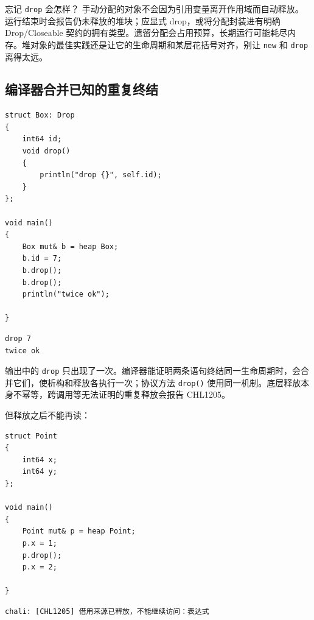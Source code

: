 忘记 \texttt{drop} 会怎样？ 手动分配的对象不会因为引用变量离开作用域而自动释放。运行结束时会报告仍未释放的堆块；应显式 drop，或将分配封装进有明确 Drop/Closeable 契约的拥有类型。遗留分配会占用预算，长期运行可能耗尽内存。堆对象的最佳实践还是让它的生命周期和某层花括号对齐，别让 \texttt{new} 和 \texttt{drop} 离得太远。

\subsection*{编译器合并已知的重复终结}

\par
\medskip
\begin{lstlisting}[style=chali]
struct Box: Drop
{
    int64 id;
    void drop()
    {
        println("drop {}", self.id);
    }
};

void main()
{
    Box mut& b = heap Box;
    b.id = 7;
    b.drop();
    b.drop();
    println("twice ok");

}
\end{lstlisting}
\par
\medskip

\par
\medskip
\begin{lstlisting}[style=out]
drop 7
twice ok
\end{lstlisting}
\par
\medskip

输出中的 \texttt{drop} 只出现了一次。编译器能证明两条语句终结同一生命周期时，会合并它们，使析构和释放各执行一次；协议方法 \texttt{drop(\allowbreak{})\allowbreak{}} 使用同一机制。底层释放本身不幂等，跨调用等无法证明的重复释放会报告 CHL1205。

但释放之后不能再读：

\par
\medskip
\begin{lstlisting}[style=chali]
struct Point
{
    int64 x;
    int64 y;
};

void main()
{
    Point mut& p = heap Point;
    p.x = 1;
    p.drop();
    p.x = 2;

}
\end{lstlisting}
\par
\medskip

\par
\medskip
\begin{lstlisting}[style=out]
chali: [CHL1205] 借用来源已释放，不能继续访问：表达式
\end{lstlisting}
\par
\medskip

